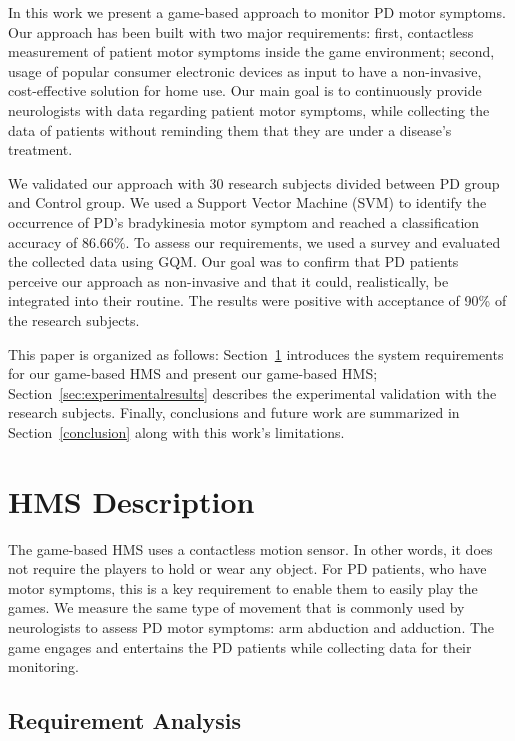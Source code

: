 \documentclass[10pt, conference, compsocconf]{IEEEtran}
\begin{document}
In this work we present a game-based approach to monitor PD motor symptoms. Our approach has been built with two major requirements: first, contactless measurement of patient motor symptoms inside the game environment; second, usage of popular consumer electronic devices as input to have a non-invasive, cost-effective solution for home use. Our main goal is to continuously provide neurologists with data regarding patient motor symptoms, while collecting the data of patients without reminding them that they are under a disease's treatment.

We validated our approach with 30 research subjects divided between PD group and Control group. We used a Support Vector Machine (SVM) to identify the occurrence of PD's bradykinesia motor symptom and reached a classification accuracy of 86.66\%. To assess our requirements, we used a survey and evaluated the collected data using GQM. Our goal was to confirm that PD patients perceive our approach as non-invasive and that it could, realistically, be integrated into their routine. The results were positive with acceptance of 90\% of the research subjects. 

This paper is organized as follows: Section~\ref{sec:proposedsystem} introduces the system requirements for our game-based HMS and present our game-based HMS; Section~\ref{sec:experimentalresults} describes the experimental validation with the research subjects. Finally, conclusions and future work are summarized in Section~\ref{conclusion} along with this work's limitations.


\section{HMS Description}\label{sec:proposedsystem}

The game-based HMS uses a contactless motion sensor. In other words, it does not require the players to hold or wear any object. For PD patients, who have motor symptoms, this is a key requirement to enable them to easily play the games. We measure the same type of movement that is commonly used by neurologists to assess PD motor symptoms: arm abduction and adduction. The game engages and entertains the PD patients while collecting data for their monitoring.

\subsection{Requirement Analysis}
\end{document}
